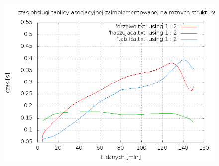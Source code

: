 \documentclass[a4paper,11pt]{report}
\begin{document}
\begin{figure}

  \begin{center}
	
  
  
    \includegraphics[scale=0.5]{./czas_dzialania_algorytmow.png}
    \label{fig:}
    \caption{}
 

\end{center}
\end{figure}
\end{document}
